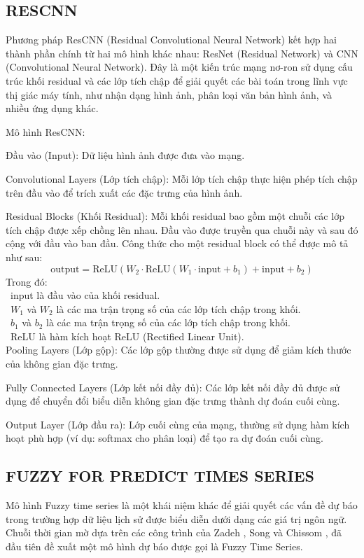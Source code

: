 \documentclass[conference]{IEEEtran}
\begin{document}
\subsection{RESCNN}
Phương pháp ResCNN (Residual Convolutional Neural Network) kết hợp hai thành phần chính từ hai mô hình khác nhau: ResNet (Residual Network) và CNN (Convolutional Neural Network). Đây là một kiến trúc mạng nơ-ron sử dụng cấu trúc khối residual và các lớp tích chập để giải quyết các bài toán trong lĩnh vực thị giác máy tính, như nhận dạng hình ảnh, phân loại văn bản hình ảnh, và nhiều ứng dụng khác.

Mô hình ResCNN:

Đầu vào (Input): Dữ liệu hình ảnh được đưa vào mạng.

Convolutional Layers (Lớp tích chập): Mỗi lớp tích chập thực hiện phép tích chập trên đầu vào để trích xuất các đặc trưng của hình ảnh.

Residual Blocks (Khối Residual): Mỗi khối residual bao gồm một chuỗi các lớp tích chập được xếp chồng lên nhau. Đầu vào được truyền qua chuỗi này và sau đó cộng với đầu vào ban đầu. 
Công thức cho một residual block có thể được mô tả như sau: 
\[
\text{output} = \text{ReLU}(W_2 \cdot \text{ReLU}(W_1 \cdot \text{input} + b_1) + \text{input} + b_2)
\]
Trong đó:\\
        \indent\textbullet\ input là đầu vào của khối residual. \\
	\indent\textbullet\ $W_1$ và $W_2$ là các ma trận trọng số của các lớp tích chập trong khối. \\
 	\indent\textbullet\ $b_1$ và $b_2$ là các ma trận trọng số của các lớp tích chập trong khối. \\
 	\indent\textbullet\ ReLU là hàm kích hoạt ReLU (Rectified Linear Unit). \\

Pooling Layers (Lớp gộp): Các lớp gộp thường được sử dụng để giảm kích thước của không gian đặc trưng.

Fully Connected Layers (Lớp kết nối đầy đủ): Các lớp kết nối đầy đủ được sử dụng để chuyển đổi biểu diễn không gian đặc trưng thành dự đoán cuối cùng.

Output Layer (Lớp đầu ra): Lớp cuối cùng của mạng, thường sử dụng hàm kích hoạt phù hợp (ví dụ: softmax cho phân loại) để tạo ra dự đoán cuối cùng.
\subsection{FUZZY FOR PREDICT TIMES SERIES}
Mô hình Fuzzy time series là một khái niệm khác để giải quyết các vấn đề dự báo trong trường hợp dữ liệu lịch sử được biểu diễn dưới dạng các giá trị ngôn ngữ. Chuỗi thời gian mờ dựa trên các công trình của Zadeh , Song và Chissom , đã đầu tiên đề xuất một mô hình dự báo được gọi là Fuzzy Time Series.
\end{document}
